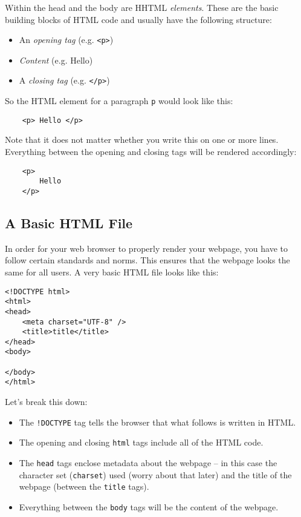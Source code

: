 \documentclass[english,11pt,a4paper]{report}
\begin{document}
Within the head and the body are HHTML \emph{elements}. These are the basic building blocks of HTML code and usually have the following structure: 
\begin{itemize}
    \item An \emph{opening tag} (e.g. \lstinline|<p>|)
    \item \emph{Content} (e.g. Hello)
    \item A \emph{closing tag} (e.g. \lstinline|</p>|)
\end{itemize}

So the HTML element for a paragraph \lstinline|p| would look like this:
\begin{lstlisting}
    <p> Hello </p>
\end{lstlisting}
Note that it does not matter whether you write this on one or more lines. Everything between the opening and closing tags will be rendered accordingly:
\begin{lstlisting}
    <p> 
        Hello 
    </p>
\end{lstlisting}

\newpage
\subsection{A Basic HTML File}
In order for your web browser to properly render your webpage, you have to follow certain standards and norms. This ensures that the webpage looks the same for all users. A very basic HTML file looks like this:

\begin{lstlisting}
<!DOCTYPE html>
<html>
<head>
    <meta charset="UTF-8" />
    <title>title</title>
</head>
<body>
    
</body>
</html>
\end{lstlisting}

Let's break this down:
\begin{itemize}
    \item The \lstinline|!DOCTYPE| tag tells the browser that what follows is written in HTML.
    \item The opening and closing \lstinline|html| tags include all of the HTML code.
    \item The \lstinline|head| tags enclose metadata about the webpage -- in this case the character set (\lstinline|charset|) used (worry about that later) and the title of the webpage (between the \lstinline|title| tags).
    \item Everything between the \lstinline|body| tags will be the content of the webpage.
\end{itemize}
\end{document}
